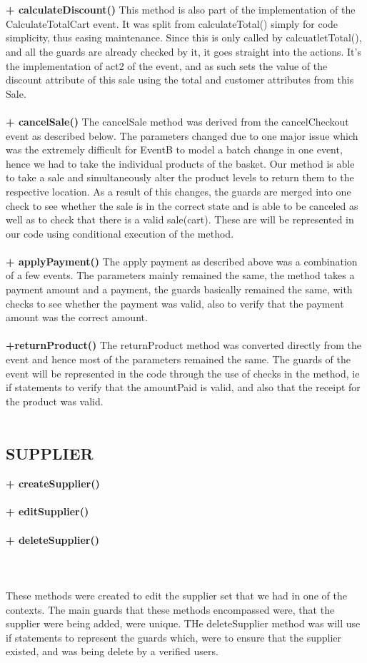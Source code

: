 \documentclass[a4paper]{article}
\begin{document}
\\\\
{\bf + calculateDiscount()}
This method is also part of the implementation of the CalculateTotalCart event. It was split from calculateTotal() simply for code simplicity, thus easing maintenance. Since this is only called by calcuatletTotal(), and all the guards are already checked by it, it goes straight into the actions. It’s the implementation of act2 of the event, and as such sets the value of the discount attribute of this sale using the total and customer attributes from this Sale.
\\\\
{\bf + cancelSale()}
The cancelSale method was derived from the cancelCheckout event as described below. The parameters changed due to one major issue which was the extremely difficult for EventB to model a batch change in one event, hence we had to take the individual products of the basket. Our method is able to take a sale and simultaneously alter the product levels to return them to the respective location. As a result of this changes, the guards are merged into one check to see whether the sale is in the correct state and is able to be canceled as well as to check that there is a valid sale(cart). These are will be represented in our code using conditional execution of the method. 
\\\\
{\bf + applyPayment()}
The apply payment as described above was a combination of a few events. The parameters mainly remained the same, the method takes a payment amount and a payment, the guards basically remained the same, with checks to see whether the  payment was valid, also to verify that the payment amount was the correct amount. 
\\\\
{\bf +returnProduct()}
The returnProduct method was converted directly from the event and hence most of the parameters remained the same. The guards of the  event will be represented in the code through the use of checks in the method, ie if statements to verify that the amountPaid is valid, and also that the receipt for the product was valid.
\\\\
\subsection{SUPPLIER}
{\bf + createSupplier()}\\\\
{\bf + editSupplier()}\\\\
{\bf + deleteSupplier()}\\\\
\\\\
These methods were created to edit the supplier set that we had in one of the contexts. The main guards that these methods encompassed were, that the supplier were being added, were unique. THe deleteSupplier method was will use if statements to represent the guards which, were to ensure that the supplier existed, and was being delete by a verified users. 
\\\\
\end{document}
